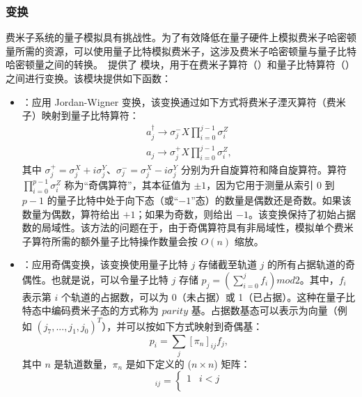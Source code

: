 \subsubsection{变换}
费米子系统的量子模拟具有挑战性。为了有效降低在量子硬件上模拟费米子哈密顿量所需的资源，可以使用量子比特模拟费米子，这涉及费米子哈密顿量与量子比特哈密顿量之间的转换。\MindQuantum\ 提供了  模块，用于在费米子算符（\FermionOperator）和量子比特算符（\QubitOperator）之间进行变换。该模块提供如下函数：
\begin{itemize}
    \item \methodjordanwigner：应用 Jordan-Wigner 变换，该变换通过如下方式将费米子湮灭算符（费米子）映射到量子比特算符：
          \begin{equation}
              \begin{split}
                  a_j^{\dagger} \to {\sigma}_j^{-} X \prod_{i=0}^{j-1} {\sigma}^Z_i \\
                  a_j \to {\sigma}_j^{+} X \prod_{i=0}^{j-1} {\sigma}^Z_i,
              \end{split}
          \end{equation}
          其中 ${\sigma}_j^{+} = {\sigma}_j^X+i{\sigma}_j^Y$、${\sigma}_j^{-} = {\sigma}_j^X-i{\sigma}_j^Y$ 分别为升自旋算符和降自旋算符。算符 $\prod_{i=0}^{p-1} {{\sigma}^Z_i}$ 称为“奇偶算符”，其本征值为 $\pm 1$，因为它用于测量从索引 0 到 $p-1$ 的量子比特中处于向下态（或“$-1$”态）的数量是偶数还是奇数。如果该数量为偶数，算符给出 $+1$；如果为奇数，则给出 $-1$。该变换保持了初始占据数的局域性。该方法的问题在于，由于奇偶算符具有非局域性，模拟单个费米子算符所需的额外量子比特操作数量会按 $O(n)$ 缩放。
    \item \methodparity：应用奇偶变换，该变换使用量子比特 $j$ 存储截至轨道 $j$ 的所有占据轨道的奇偶性。也就是说，可以令量子比特 $j$ 存储 $p_j = (\sum_{i=0}^j f_i) mod 2$。其中，$f_i$ 表示第 $i$ 个轨道的占据数，可以为 0（未占据）或 1（已占据）。这种在量子比特态中编码费米子态的方式称为 $parity$ 基。占据数基态可以表示为向量（例如 $(j_7,...,j_1,j_0)^T$），并可以按如下方式映射到奇偶基：
          \begin{equation}
              p_i = \sum_j {[\pi_n]_{ij} f_j},
          \end{equation}
          其中 $n$ 是轨道数量，$\pi_n$ 是如下定义的 ($n \times n$) 矩阵：
          \begin{equation}
              [\pi_n]_{ij} =
              \begin{cases}
                  1 & i<j     \\

\end{cases}
\end{equation}
\end{itemize}
